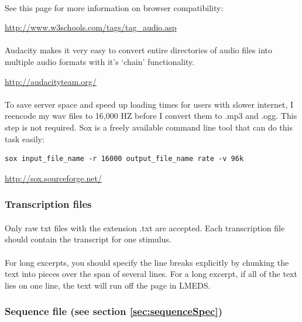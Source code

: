 \documentclass[12pt, oneside]{scrbook}   	%
\begin{document}
\paragraph{}
See this page for more information on browser compatibility:

\url{http://www.w3schools.com/tags/tag\_audio.asp}

\paragraph{}
Audacity makes it very easy to convert entire directories of audio files into multiple audio formats with it's `chain' functionality.  

\url{http://audacityteam.org/}

\paragraph{}
To save server space and speed up loading times for users with slower internet, I reencode my wav files to 16,000 HZ before I convert them to .mp3 and .ogg.  This step is not required.  Sox is a freely available command line tool that can do this task easily:

\begin{lstlisting}
sox input_file_name -r 16000 output_file_name rate -v 96k
\end{lstlisting}

\url{http://sox.sourceforge.net/}

\subsubsection{Transcription files}

\paragraph{}
Only raw txt files with the extension .txt are accepted.  Each transcription file should contain the transcript for one stimulus.

\paragraph{}
For long excerpts, you should specify the line breaks explicitly by chunking the text into pieces over the span of several lines.  For a long excerpt, if all of the text lies on one line, the text will run off the page in LMEDS.

\subsubsection{Sequence file (see section \ref{sec:sequenceSpec})}
\end{document}

